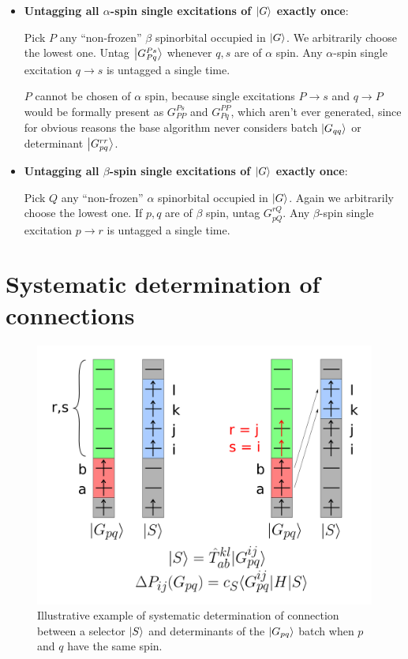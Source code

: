 \documentclass[./thesis.tex]{subfiles}
\begin{document}
\begin{itemize}
\item
\textbf{Untagging all $\alpha$-spin single excitations of $\ket G$ exactly once}:

Pick $P$ any ``non-frozen'' $\beta$ spinorbital occupied in $\ket G$. We arbitrarily choose the lowest one. Untag $\ket {G_{Pq}^{Ps}}$ whenever $q,s$ are of $\alpha$ spin. Any $\alpha$-spin single excitation $q \rightarrow  s$ is untagged a single time.

$P$ cannot be chosen of $\alpha$ spin, because single excitations $P \rightarrow  s$ and $q \rightarrow  P$ would be formally present as $G_{PP}^{Ps}$ and $G_{Pq}^{PP}$, which aren't ever generated, since for obvious reasons the base algorithm never considers batch $\ket {G_{qq}}$ or determinant $\ket {G_{pq}^{rr}}$.
\item
\textbf{Untagging all $\beta$-spin single excitations of $\ket G$ exactly once}:

Pick $Q$ any ``non-frozen'' $\alpha$ spinorbital occupied in $\ket G$. Again we arbitrarily choose the lowest one. If $p,q$ are of $\beta$ spin, untag $G_{pQ}^{rQ}$. Any $\beta$-spin single excitation $p \rightarrow  r$ is untagged a single time.
\end{itemize}



\section{Systematic determination of connections}

\begin{figure}[h!]
        \begin{center}
                \includegraphics[width=0.70\columnwidth]{figures/cipsi/systematic_determination}
        \end{center}
        \caption{Illustrative example of systematic determination of connection between a selector $\ket S$ and determinants of the $\ket {G_{pq}}$ batch when $p$ and $q$ have the same spin.}
        \label{fig:systematic_determination}
        
\end{figure}
\end{document}
